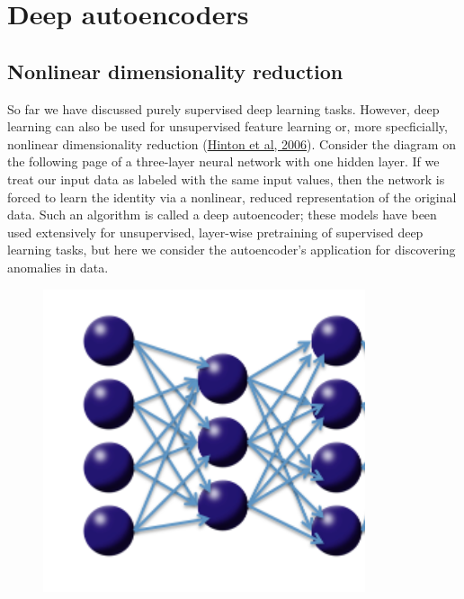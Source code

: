 \documentclass[12pt]{article}
\begin{document}
\section{Deep autoencoders}

\subsection{Nonlinear dimensionality reduction}
So far we have discussed purely supervised deep learning tasks. However, deep learning can also be used for unsupervised feature learning or, more specficially, nonlinear dimensionality reduction  (\href{http://www.cs.toronto.edu/~hinton/science.pdf}{Hinton et al, 2006}). Consider the diagram on the following page of a three-layer neural network with one hidden layer. If we treat our input data as labeled with the same input values, then the network is forced to learn the identity via a nonlinear, reduced representation of the original data. Such an algorithm is called a deep autoencoder; these models have been used extensively for unsupervised, layer-wise pretraining of supervised deep learning tasks, but here we consider the autoencoder's application for discovering anomalies in data. 
\\
\begin{figure}[h!]
\centering
\includegraphics[scale=0.7]{autoencoder.png}
\end{figure}
\end{document}
